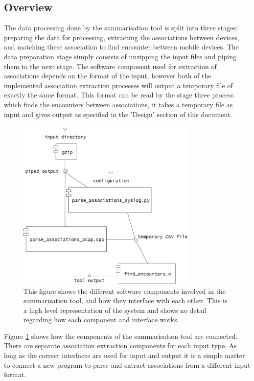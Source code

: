 \subsection{Overview}

The data processing done by the summarisation tool is split into three stages: preparing the data for processing, extracting the associations between devices, and matching these association to find encounter between mobile devices. The data preparation stage simply consists of unzipping the input files and piping them to the next stage. The software component used for extraction of associations depends on the format of the input, however both of the implemented association extraction processes will output a temporary file of exactly the same format. This format can be read by the stage three process which finds the encounters between associations, it takes a temporary file as input and gives output as specified in the 'Design' section of this document.

\begin{figure}[h]
    \centering
    \includegraphics[width=0.8\textwidth]{component_diagram.png}
    \caption{This figure shows the different software components involved in the summarisation tool, and how they interface with each other. This is a high level representation of the system and shows no detail regarding how each component and interface works.}
    \label{fig:component_dia}
\end{figure}

Figure \ref{fig:component_dia} shows how the components of the summarisation tool are connected. There are separate association extraction components for each input type. As long as the correct interfaces are used for input and output it is a simple matter to connect a new program to parse and extract associations from a different input format.

